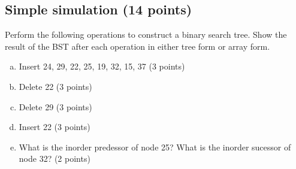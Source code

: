 \documentclass[11pt]{exam}
\begin{document}
\subsection{Simple simulation (14 points)}

Perform the following operations to construct a binary search tree. Show the result of the BST after each operation in either tree form or array form.

\begin{enumerate}[a)]
\item Insert 24, 29, 22, 25, 19, 32, 15, 37 (3 points)
\begin{solution}
\end{solution}

\item Delete 22 (3 points)
\begin{solution}
\end{solution}

\item Delete 29 (3 points)
\begin{solution}
\end{solution}

\item Insert 22 (3 points)
\begin{solution}
\end{solution}

\item What is the inorder predessor of node 25? What is the inorder sucessor of node 32? (2 points)
\begin{solution}
\end{solution}


\end{enumerate}
\end{document}
